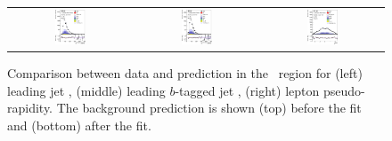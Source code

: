 \begin{figure}[tp]
\begin{tabular}{ccc}
  \includegraphics[width=0.27\textwidth]{Analysis/Figures_ttH/tesis_vars/postfit/jet1_pt_5jetex3btagex.eps} &
  \includegraphics[width=0.27\textwidth]{Analysis/Figures_ttH/tesis_vars/postfit/bjet1_pt_5jetex3btagex.eps} &
  \includegraphics[width=0.27\textwidth]{Analysis/Figures_ttH/tesis_vars/postfit/lep_eta_5jetex3btagex.eps} \\
\end{tabular}
\caption{Comparison between data and prediction in the \fivethree\ region for (left) leading jet \pt, (middle) leading $b$-tagged jet \pt, (right) lepton pseudo-rapidity. The background prediction is shown (top) before the fit and (bottom) after the fit.}
  \label{fig:vars2_fivethree}
\end{figure}
